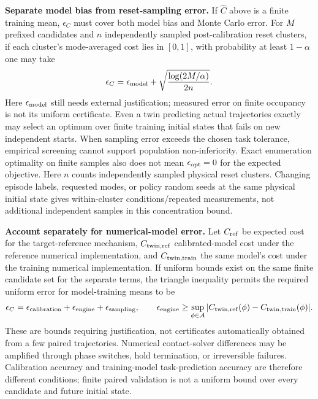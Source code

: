 \textbf{Separate model bias from reset-sampling error.} If $\widehat C$ above is a finite
training mean, $\epsilon_C$ must cover both model bias and Monte Carlo error.
For $M$ prefixed candidates and $n$ independently sampled post-calibration reset clusters,
if each cluster's mode-averaged cost lies in $[0,1]$, with probability at least $1-\alpha$ one may take
\[
 \epsilon_C=\epsilon_{\rm model}
       +\sqrt{\frac{\log(2M/\alpha)}{2n}}.
\]
Here $\epsilon_{\rm model}$ still needs external justification; measured error on finite occupancy
is not its uniform certificate. Even a twin predicting actual trajectories exactly may select an optimum over finite training initial states
that fails on new independent starts. When sampling error exceeds the chosen task tolerance, empirical screening
cannot support population non-inferiority.
Exact enumeration optimality on finite samples also does not mean $\epsilon_{\rm opt}=0$ for the expected objective.
Here $n$ counts independently sampled physical reset clusters. Changing episode labels, requested modes,
or policy random seeds at the same physical initial state gives within-cluster conditions/repeated measurements,
not additional independent samples in this concentration bound.

\textbf{Account separately for numerical-model error.} Let $C_{\rm ref}$ be expected cost for the target-reference mechanism,
$C_{\rm twin,ref}$ calibrated-model cost under the reference numerical implementation,
and $C_{\rm twin,train}$ the same model's cost under the training numerical implementation. If uniform bounds exist on the same finite
candidate set for the separate terms, the triangle inequality permits the required uniform error for model-training means to be
\[
 \epsilon_C = \epsilon_{\rm calibration}
                  +\epsilon_{\rm engine}
                  +\epsilon_{\rm sampling},\qquad
 \epsilon_{\rm engine}\ge
 \sup_{\phi\in\mathcal A}
 |C_{\rm twin,ref}(\phi)-C_{\rm twin,train}(\phi)|.
\]
These are bounds requiring justification, not certificates automatically obtained from a few paired trajectories.
Numerical contact-solver differences may be amplified through phase switches, hold termination, or irreversible failures.
Calibration accuracy and training-model task-prediction accuracy are therefore different conditions; finite paired validation
is not a uniform bound over every candidate and future initial state.

